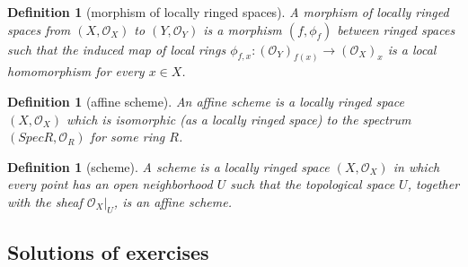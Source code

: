 \documentclass[12pt]{article}
\newtheorem{definition}[proposition]{Definition}
\begin{document}
\begin{definition}[morphism of locally ringed spaces]
	A morphism of locally ringed spaces from $(X, \mathscr{O}_X)$ to $(Y, \mathscr{O}_Y)$ is a morphism $(f, \phi_f)$ between ringed spaces such that the induced map of local rings $\phi_{f, x}: (\mathscr{O}_Y)_{f(x)} \rightarrow (\mathscr{O}_X)_x$ is a local homomorphism for every $x \in X$.  
\end{definition}	

\begin{definition}[affine scheme]
	An affine scheme is a locally ringed space $(X, \mathscr{O}_X)$ which is isomorphic (as a locally ringed space) to the spectrum $(Spec R, \mathscr{O}_R)$ for some ring $R$. 
\end{definition}

\begin{definition}[scheme]
	A scheme is a locally ringed space $(X, \mathscr{O}_X)$ in which every point has an open neighborhood $U$ such that the topological space $U$, together with the sheaf $\mathscr{O}_X | _U$, is an affine scheme.
\end{definition}	
																	

\begin{appendices}
	\addappheadtotoc

\section{Solutions of exercises}

	

	
\end{appendices}						

		
\end{document}
